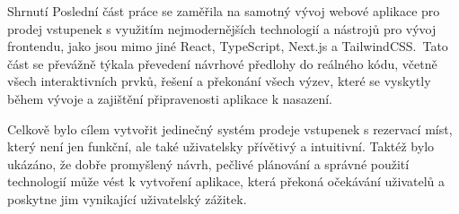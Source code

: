 \begin{section}{Shrnutí}
    Poslední část práce se zaměřila na samotný vývoj webové aplikace pro prodej vstupenek s využitím nejmodernějších technologií a nástrojů pro vývoj frontendu, jako jsou mimo jiné React, TypeScript, Next.js a TailwindCSS.\
    Tato část se převážně týkala převedení návrhové předlohy do reálného kódu, včetně všech interaktivních prvků, řešení a překonání všech výzev, které se vyskytly během vývoje a zajištění připravenosti aplikace k nasazení.

    Celkově bylo cílem vytvořit jedinečný systém prodeje vstupenek s rezervací míst, který není jen funkční, ale také uživatelsky přívětivý a intuitivní.
    Taktéž bylo ukázáno, že dobře promyšlený návrh, pečlivé plánování a správné použití technologií může vést k vytvoření aplikace, která překoná očekávání uživatelů a poskytne jim vynikající uživatelský zážitek.
\end{section}

